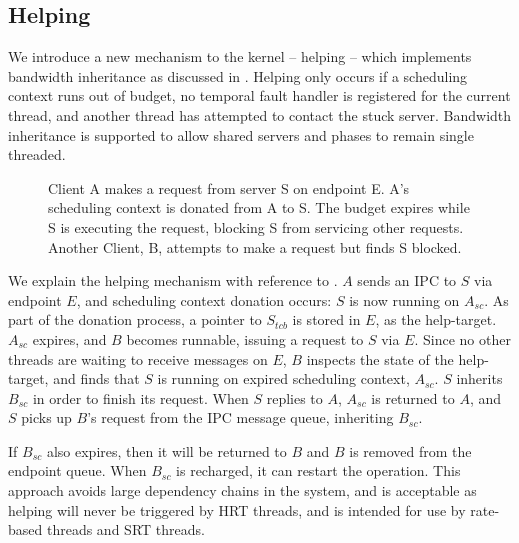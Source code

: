 \subsection{Helping}

We introduce a new mechanism to the kernel -- helping -- which implements bandwidth inheritance as discussed in .
Helping only occurs if a scheduling context runs out of budget, no temporal fault handler is registered for the current thread, and another thread has attempted to contact the stuck server.
Bandwidth inheritance is supported to allow shared servers and phases to remain single threaded.

\begin{figure}
\centering
\caption{Client A makes a request from server S on endpoint E. A's scheduling context is donated from A to S. The budget expires while S is executing the request, blocking S from servicing other requests. Another Client, B, attempts to make a request but finds S blocked.}
\label{fig:budget-expiry}
\end{figure}

We explain the helping mechanism with reference to .
$A$ sends an IPC to $S$ via endpoint $E$, and scheduling context donation occurs: $S$ is now running on $A_{sc}$.
As part of the donation process, a pointer to $S_{tcb}$ is stored in $E$, as the help-target.
$A_{sc}$ expires, and $B$ becomes runnable, issuing a request to $S$ via $E$.
Since no other threads are waiting to receive messages on $E$, $B$ inspects the state of the help-target, and finds that $S$ is running on expired scheduling context, $A_{sc}$.
$S$ inherits $B_{sc}$ in order to finish its request.
When $S$ replies to $A$, $A_{sc}$ is returned to $A$, and $S$ picks up $B$'s request from the IPC message queue, inheriting $B_{sc}$.

If $B_{sc}$ also expires, then it will be returned to $B$ and $B$ is removed from the endpoint queue.
When $B_{sc}$ is recharged, it can restart the operation.
This approach avoids large dependency chains in the system, and is acceptable as helping will never be triggered by \gls{HRT} threads, and is intended for use by rate-based threads and \gls{SRT} threads.


